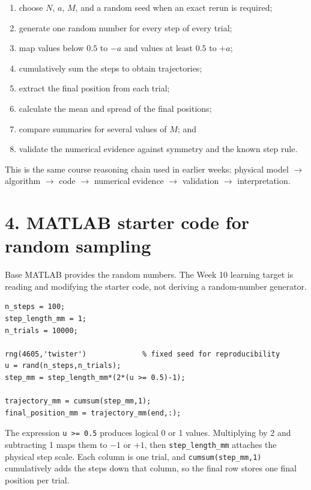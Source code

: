 \documentclass[11pt,a4paper]{article}
\begin{document}
\begin{enumerate}[nosep,leftmargin=7mm]
\item choose $N$, $a$, $M$, and a random seed when an exact rerun is required;
\item generate one random number for every step of every trial;
\item map values below $0.5$ to $-a$ and values at least $0.5$ to $+a$;
\item cumulatively sum the steps to obtain trajectories;
\item extract the final position from each trial;
\item calculate the mean and spread of the final positions;
\item compare summaries for several values of $M$; and
\item validate the numerical evidence against symmetry and the known step rule.
\end{enumerate}

This is the same course reasoning chain used in earlier weeks: physical model $\rightarrow$ algorithm $\rightarrow$ code $\rightarrow$ numerical evidence $\rightarrow$ validation $\rightarrow$ interpretation.

\section*{4. MATLAB starter code for random sampling}
Base MATLAB provides the random numbers. The Week 10 learning target is reading and modifying the starter code, not deriving a random-number generator.

\begin{lstlisting}[style=matlabstyle,caption={MATLAB generation of random steps and cumulative trajectories}]
n_steps = 100;
step_length_mm = 1;
n_trials = 10000;

rng(4605,'twister')             % fixed seed for reproducibility
u = rand(n_steps,n_trials);
step_mm = step_length_mm*(2*(u >= 0.5)-1);

trajectory_mm = cumsum(step_mm,1);
final_position_mm = trajectory_mm(end,:);
\end{lstlisting}

The expression \texttt{u >= 0.5} produces logical 0 or 1 values. Multiplying by 2 and subtracting 1 maps them to $-1$ or $+1$, then \texttt{step\_length\_mm} attaches the physical step scale. Each column is one trial, and \texttt{cumsum(step\_mm,1)} cumulatively adds the steps down that column, so the final row stores one final position per trial.
\end{document}
